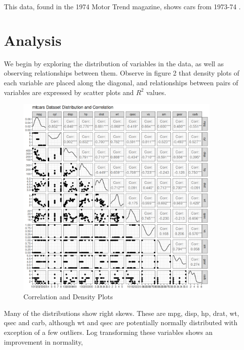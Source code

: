 \documentclass[a4paper]{article}
\begin{document}
This data, found in the 1974 Motor Trend magazine, shows cars from 1973-74 \cite{data}. 

\section{Analysis}
We begin by exploring the distribution of variables in the data, as well as observing relationships between them.
Observe in figure 2 that density plots of each variable are placed along the diagonal, and relationships between pairs of variables are expressed by scatter plots and \(R^2\) values.
\begin{figure}[H]
	\centering
	\includegraphics[width=0.9\textwidth]{"../corrplot.png"}
	\caption{Correlation and Density Plots}
	\label{fig:Correlation-and-Density-Plots}
\end{figure}
Many of the distributions show right skews. These are mpg, disp, hp, drat, wt, qsec and carb, although wt and qsec are potentially normally distributed with exception of a few outliers. Log transforming these variables shows an improvement in normality, 
\end{document}
